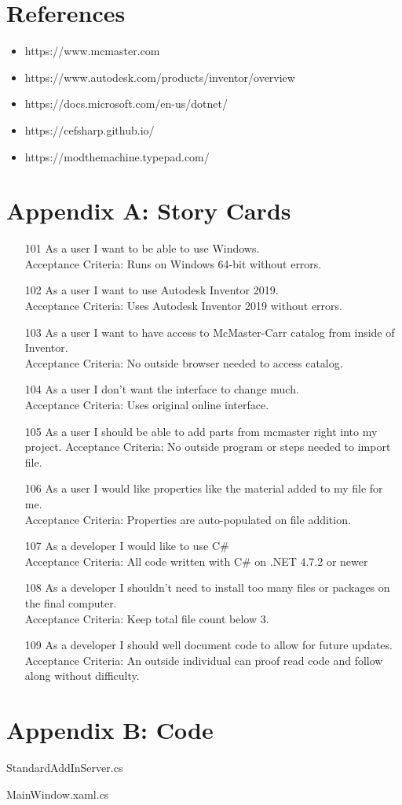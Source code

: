 \documentclass[12pt, letterpaper]{article}
\begin{document}
\section{References}

\begin{itemize}
\item https://www.mcmaster.com
\item https://www.autodesk.com/products/inventor/overview
\item https://docs.microsoft.com/en-us/dotnet/
\item https://cefsharp.github.io/
\item https://modthemachine.typepad.com/

\end{itemize}

\newpage
\section{Appendix A: Story Cards}
\begin{itemize}
    \item [101] As a user I want to be able to use Windows.\\
    Acceptance Criteria: Runs on Windows 64-bit without errors.
    \item [102] As a user I want to use Autodesk Inventor 2019.\\
    Acceptance Criteria: Uses Autodesk Inventor 2019 without errors.
    \item [103] As a user I want to have access to McMaster-Carr catalog from inside of Inventor.\\
    Acceptance Criteria: No outside browser needed to access catalog.
    \item [104] As a user I don't want the interface to change much.\\
    Acceptance Criteria: Uses original online interface.
    \item [105] As a user I should be able to add parts from mcmaster right into my project.
    Acceptance Criteria: No outside program or steps needed to import file.
    \item [106] As a user I would like properties like the material added to my file for me.\\
    Acceptance Criteria: Properties are auto-populated on file addition.
    \item [107] As a developer I would like to use C\# \\
    Acceptance Criteria: All code written with C# on .NET 4.7.2 or newer
    \item [108] As a developer I shouldn't need to install too many files or packages on the final computer.\\
    Acceptance Criteria: Keep total file count below 3.
    \item [109] As a developer I should well document code to allow for future updates.\\
    Acceptance Criteria: An outside individual can proof read code and follow along without difficulty.
\end{itemize}



\newpage
\section{Appendix B: Code}
StandardAddInServer.cs
\lstset{style=sharpc}

\newpage
MainWindow.xaml.cs

\end{document}
